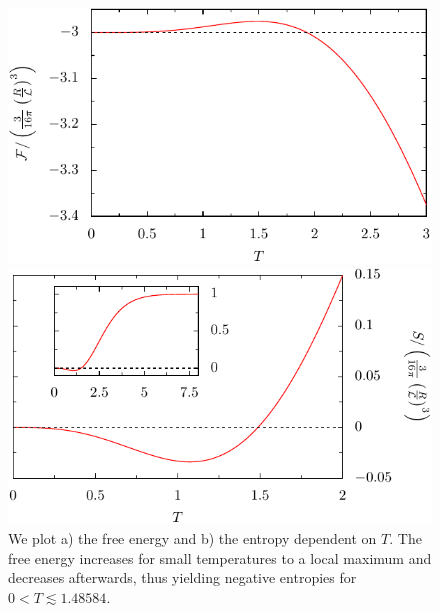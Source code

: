 \begin{figure}
  \begin{minipage}[b]{.5\linewidth}
  \centering
  \includegraphics[scale=0.74]{plots/scattering_F_ld.pdf}
  \end{minipage}
  \begin{minipage}[b]{.5\linewidth}
  \centering
  \includegraphics[scale=0.74]{plots/scattering_S_ld.pdf}
  \end{minipage}

  \caption{We plot a) the free energy and b) the entropy dependent on $T$. The free energy increases for small temperatures to a local maximum
  and decreases afterwards, thus yielding negative entropies for $0 < T \lesssim 1.48584$.}
  \label{fig:ld_F}
\end{figure}


